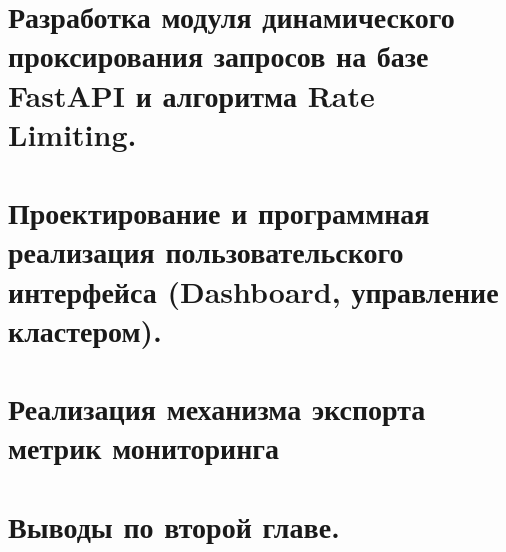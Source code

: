 \section{Разработка модуля динамического проксирования запросов на базе FastAPI и алгоритма Rate Limiting. }
\section{Проектирование и программная реализация пользовательского интерфейса (Dashboard, управление кластером). }
\section{Реализация механизма экспорта метрик мониторинга}
\section{Выводы по второй главе.}